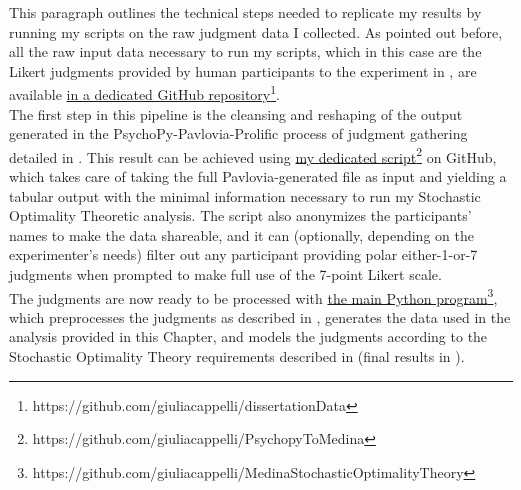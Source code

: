 This paragraph outlines the technical steps needed to replicate my results by running my scripts on the raw judgment data I collected. %
As pointed out before, all the raw input data necessary to run my scripts, which in this case are the Likert judgments provided by human participants to the experiment in , are available \href{https://github.com/giuliacappelli/dissertationData}{in a dedicated GitHub repository}\footnote{https://github.com/giuliacappelli/dissertationData}.\\
The first step in this pipeline is the cleansing and reshaping of the output generated in the PsychoPy-Pavlovia-Prolific process of judgment gathering detailed in . This result can be achieved using \href{https://github.com/giuliacappelli/PsychopyToMedina}{my dedicated script}\footnote{https://github.com/giuliacappelli/PsychopyToMedina} on GitHub, which takes care of taking the full Pavlovia-generated file as input and yielding a tabular output with the minimal information necessary to run my Stochastic Optimality Theoretic analysis. The script also anonymizes the participants' names to make the data shareable, and it can (optionally, depending on the experimenter's needs) filter out any participant providing polar either-1-or-7 judgments when prompted to make full use of the 7-point Likert scale.\\
The judgments are now ready to be processed with \href{https://github.com/giuliacappelli/MedinaStochasticOptimalityTheory}{the main Python program}\footnote{https://github.com/giuliacappelli/MedinaStochasticOptimalityTheory}, which 
preprocesses the judgments as described in , generates the data used in the analysis provided in this Chapter, and models the judgments according to the Stochastic Optimality Theory requirements described in  (final results in ).

